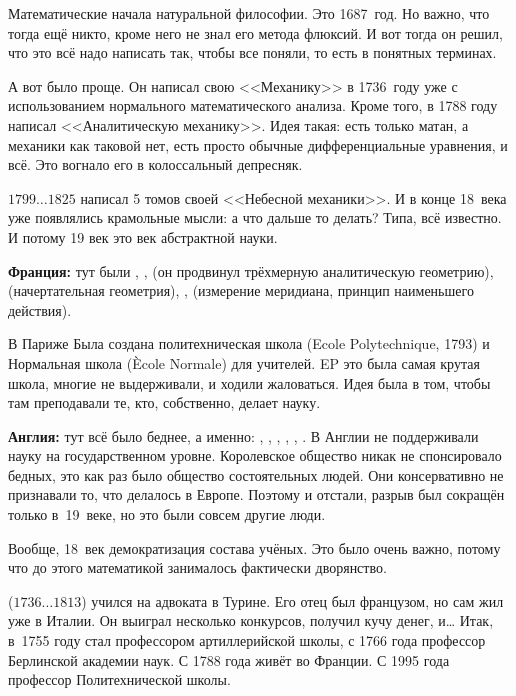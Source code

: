 \documentclass[a4paper,oneside,fleqn,10pt]{article}
\newcommand{\pe}[2]{${#1}\ldots{#2}$}
\begin{document}
 Математические начала натуральной философии. Это 1687~год.
Но важно, что тогда ещё никто, кроме него не знал его метода флюксий.
И вот тогда он решил, что это всё надо написать так, чтобы все поняли,
то есть в понятных терминах.

А вот  было проще. Он написал свою <<Механику>> в 1736~году уже с использованием
нормального математического анализа. Кроме того, в 1788 году  написал
<<Аналитическую механику>>. Идея такая: есть только матан, а механики как таковой
нет, есть просто обычные дифференциальные уравнения, и всё. Это вогнало его
в колоссальный депресняк.

\pe{1799}{1825}  написал 5 томов своей <<Небесной механики>>. И в конце 18~века уже
появлялись крамольные мысли: а что дальше то делать? Типа, всё известно.
И потому 19 век это век абстрактной науки.

\textbf{Франция:} тут были , ,  (он продвинул трёхмерную аналитическую геометрию),
 (начертательная геометрия), ,  (измерение меридиана, принцип наименьшего действия).

В Париже Была создана политехническая школа (Ecole Polytechnique, 1793) и Нормальная школа (\`Ecole Normale) для учителей.
EP это была самая крутая школа, многие не выдерживали, и ходили жаловаться.
Идея была в том, чтобы там преподавали те, кто, собственно, делает науку.

\textbf{Англия:} тут всё было беднее, а именно: , , , ,
, .
В Англии не поддерживали науку на государственном уровне. Королевское общество никак не спонсировало бедных,
это как раз было общество состоятельных людей.
Они консервативно не признавали то, что делалось в Европе. Поэтому и отстали, разрыв
был сокращён только в~19~веке, но это были совсем другие люди.

Вообще, 18~век демократизация состава учёных.  Это было очень важно, потому что до этого
математикой занималось фактически дворянство.

 (\pe{1736}{1813}) учился на адвоката в Турине. Его отец был французом, но
сам жил уже в Италии. Он выиграл несколько конкурсов, получил кучу денег, и\ldots
Итак, в~1755 году стал профессором артиллерийской школы, с 1766 года профессор Берлинской
академии наук. С 1788 года живёт во Франции. С 1995 года профессор Политехнической
школы.
\end{document}
